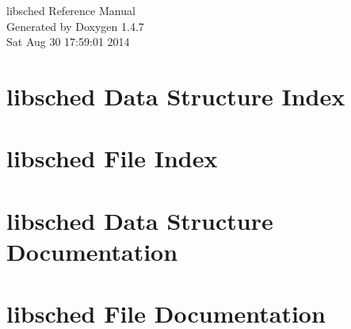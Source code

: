 \documentclass[letterpaper]{book}
\begin{document}
\begin{titlepage}
\vspace*{7cm}
\begin{center}
{\Large libsched Reference Manual}\\
\vspace*{1cm}
{\large Generated by Doxygen 1.4.7}\\
\vspace*{0.5cm}
{\small Sat Aug 30 17:59:01 2014}\\
\end{center}
\end{titlepage}
\clearemptydoublepage
{}
\tableofcontents
\clearemptydoublepage
{}
\chapter{libsched Data Structure Index}

\chapter{libsched File Index}

\chapter{libsched Data Structure Documentation}




















\chapter{libsched File Documentation}

















\printindex
\end{document}
